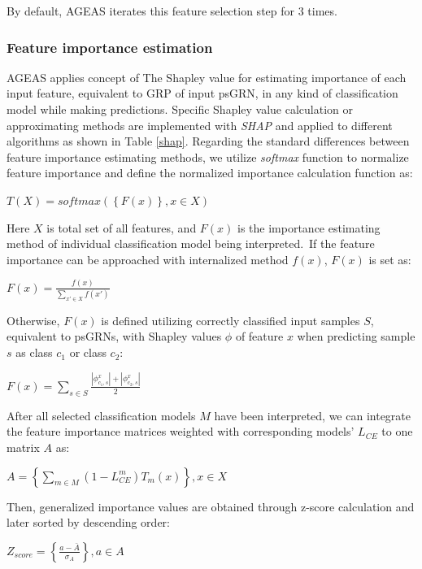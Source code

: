 \documentclass[fleqn,10pt]{wlscirep}
\begin{document}
    By default, AGEAS iterates this feature selection step for 3 times.

    \subsubsection*{Feature importance estimation}
      \label{features_importances}
      AGEAS applies concept of The Shapley value\cite{roth_1988} for estimating importance of each input feature, equivalent to GRP of input psGRN, in any kind of classification model while making predictions.
      Specific Shapley value calculation or approximating methods are implemented with \emph{SHAP}\cite{lundberg2017unified} and applied to different algorithms as shown in Table \ref{shap}.
      Regarding the standard differences between feature importance estimating methods, we utilize \emph{softmax} function to normalize feature importance and define the normalized importance calculation function as:

      \centerline{$T(X) = softmax(\left\{ F(x) \right\}, x \in X)$}

      \noindent Here $X$ is total set of all features, and $F(x)$ is the importance estimating method of individual classification model being interpreted.\
      If the feature importance can be approached with internalized method $f(x)$, $F(x)$ is set as:

      \centerline{$F(x) = \frac{f(x)}{\sum_{x' \in X} f(x')}$}

      \noindent Otherwise, $F(x)$ is defined utilizing correctly classified input samples $S$, equivalent to psGRNs, with Shapley values $\phi$ of feature $x$ when predicting sample $s$ as class $c_1$ or class $c_2$:\

      \centerline{$F(x) = \sum_{s \in S}\frac{\left|\phi_{c_1,s}^{x}\right| + \left|\phi_{c_2,s}^{x}\right|}{2}$}

      \noindent After all selected classification models $M$ have been interpreted, we can integrate the feature importance matrices weighted with corresponding models' $L_{CE}$ to one matrix $A$ as:\

      \centerline{
        $ A = \left\{ \sum_{m \in M}(1 - L_{CE}^{m})T_{m}(x) \right\}, x \in X $
      }

      \noindent Then, generalized importance values are obtained through z-score calculation and later sorted by descending order:\

      \centerline{
        $Z_{score} = \left\{\frac{a - \bar{A}}{\sigma_A}\right\}, a \in A$
      }
\end{document}
